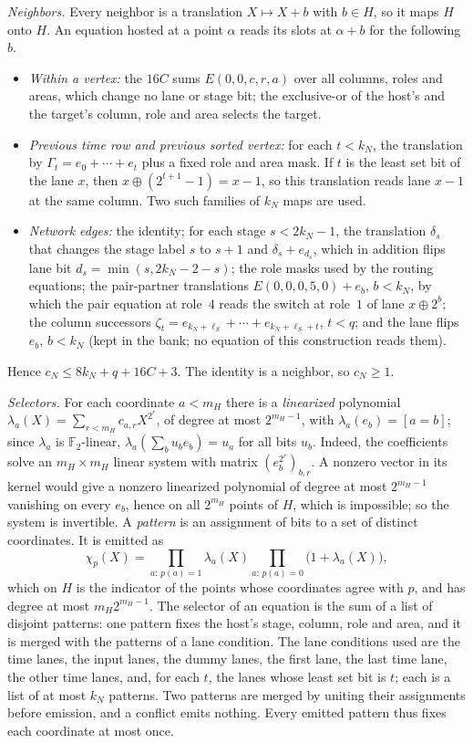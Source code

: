 \documentclass[11pt,letterpaper]{article}
\theoremstyle{definition}
\theoremstyle{remark}
\begin{document}
\emph{Neighbors.} Every neighbor is a translation \(X\mapsto X+b\) with
\(b\in H\), so it maps \(H\) onto \(H\). An equation hosted at a point
\(\alpha\) reads its slots at \(\alpha+b\) for the following \(b\).
\begin{itemize}
\item \emph{Within a vertex:} the \(16C\) sums
\(E(0,0,c,r,a)\) over all columns, roles and areas, which change no
lane or stage bit; the exclusive-or of the host's and the target's
column, role and area selects the target.
\item \emph{Previous time row and previous sorted vertex:} for each
\(t<k_N\), the translation by \(\Gamma_t=e_0+\cdots+e_t\) plus a fixed
role and area mask. If \(t\) is the least set bit of the lane \(x\), then
\(x\oplus(2^{t+1}-1)=x-1\), so this translation reads lane \(x-1\) at
the same column. Two such families of \(k_N\) maps are used.
\item \emph{Network edges:} the identity; for each stage \(s<2k_N-1\),
the translation \(\delta_s\) that changes the stage label \(s\) to
\(s+1\) and \(\delta_s+e_{d_s}\), which in addition flips lane bit
\(d_s=\min(s,2k_N-2-s)\); the role masks used by the routing equations;
the pair-partner translations \(E(0,0,0,5,0)+e_b\), \(b<k_N\), by which
the pair equation at role~\(4\) reads the switch at role~\(1\) of lane
\(x\oplus2^b\); the column successors \(\zeta_t=e_{k_N+\ell_S}+\cdots+e_{k_N+\ell_S+t}\),
\(t<q\); and the lane flips \(e_b\), \(b<k_N\) (kept in the bank; no
equation of this construction reads them).
\end{itemize}
Hence \(c_N\le8k_N+q+16C+3\). The identity is a neighbor, so
\(c_N\ge1\).

\emph{Selectors.} For each coordinate \(a<m_H\) there is a
\emph{linearized} polynomial
\(\lambda_a(X)=\sum_{r<m_H}c_{a,r}X^{2^r}\), of degree at most
\(2^{m_H-1}\), with \(\lambda_a(e_b)=[a=b]\); since \(\lambda_a\) is
\(\mathbb F_2\)-linear, \(\lambda_a(\sum_bu_be_b)=u_a\) for all bits
\(u_b\). Indeed, the coefficients solve an \(m_H\times m_H\) linear
system with matrix \((e_b^{2^r})_{b,r}\). A nonzero vector in its kernel
would give a nonzero linearized polynomial of degree at most
\(2^{m_H-1}\) vanishing on every \(e_b\), hence on all \(2^{m_H}\) points
of \(H\), which is impossible; so the system is invertible. A
\emph{pattern} is an assignment of bits to a set of distinct
coordinates. It is emitted as
\[
 \chi_p(X)=\prod_{a:\,p(a)=1}\lambda_a(X)\prod_{a:\,p(a)=0}
 \bigl(1+\lambda_a(X)\bigr),
\]
which on \(H\) is the indicator of the points whose coordinates agree
with \(p\), and has degree at most \(m_H2^{m_H-1}\). The selector of an
equation is the sum of a list of disjoint patterns: one pattern fixes
the host's stage, column, role and area, and it is merged with the
patterns of a lane condition. The lane conditions used are the time
lanes, the input lanes, the dummy lanes, the first lane, the last time
lane, the other time lanes, and, for each \(t\), the lanes whose least
set bit is \(t\); each is a list of at most \(k_N\) patterns. Two patterns
are merged by uniting their assignments before emission, and a conflict
emits nothing. Every emitted pattern thus fixes each coordinate at most
once.
\end{document}

